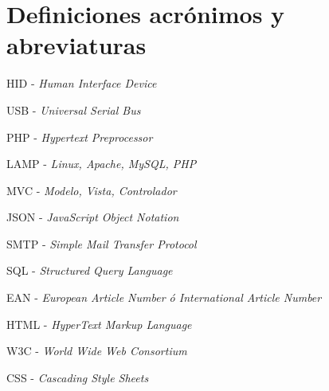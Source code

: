 \section{Definiciones acrónimos y abreviaturas}

    HID - \emph{Human Interface Device}

    USB - \emph{Universal Serial Bus}

    PHP - \emph{Hypertext Preprocessor}

    LAMP - \emph{Linux, Apache, MySQL, PHP}

    MVC - \emph{Modelo, Vista, Controlador}

    JSON - \emph{JavaScript Object Notation}

    SMTP - \emph{Simple Mail Transfer Protocol}

    SQL - \emph{Structured Query Language}

    EAN - \emph{European Article Number ó International Article Number}

    HTML - \emph{HyperText Markup Language}

    W3C - \emph{World Wide Web Consortium}

    CSS - \emph{Cascading Style Sheets}
